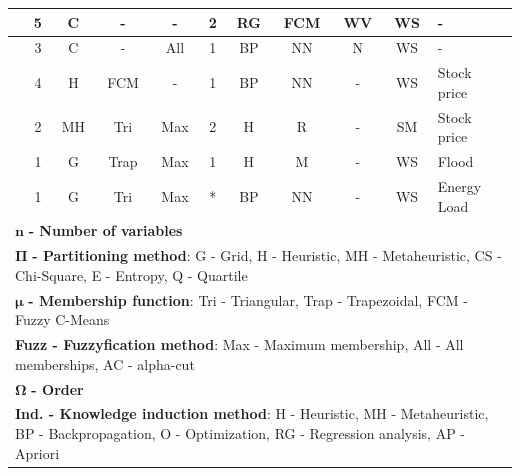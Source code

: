 \begin{center}
\begin{landscape}
\begin{longtable}[c]{|m{4cm}|c|c|c|c|c|c|c|c|c|m{5cm}|}
\cite{Yang2018}            & 5                  & C            & -           & -                      & 2              & RG                      & FCM                 & WV                 & WS            & -                     \\ \hline
\cite{Tran2018}            & 3                  & C            & -           & All                    & 1              & BP                            & NN                & N            & WS            & -                     \\ \hline
\cite{Zhang2018}           & 4                  & H                & FCM         & -                      & 1              & BP                             & NN                 & -                        & WS            & Stock price           \\ \hline
\cite{Zhang2018a}          & 2                  & MH         & Tri  & Max                & 2              & H                       & R               & -                        & SM              & Stock price           \\ \hline
\cite{Chen2019a}            & 1                  & G                  & Trap & Max                & 1              & H                       & M              & -                        & WS            & Flood \\  \hline
\cite{Sadaei2019}            & 1                  & G                  & Tri & Max                &  *              & BP                       & NN              & -                        & WS            & Energy Load \\  \hline
\multicolumn{11}{l}{$\mathbf{n}$\textbf{ - Number of variables}} \\
\multicolumn{11}{p{20cm}}{$\mathbf{\Pi}$\textbf{ - Partitioning method}: G - Grid, H - Heuristic, MH - Metaheuristic, CS - Chi-Square, E - Entropy, Q - Quartile} \\
\multicolumn{11}{p{20cm}}{$\mathbf{\mu}$\textbf{ - Membership function}: Tri - Triangular, Trap - Trapezoidal, FCM - Fuzzy C-Means} \\
\multicolumn{11}{p{20cm}}{\textbf{Fuzz - Fuzzyfication method}: Max - Maximum membership, All - All memberships, AC - alpha-cut} \\
\multicolumn{11}{l}{$\mathbf{\Omega}$\textbf{  - Order}} \\
\multicolumn{11}{p{20cm}}{\textbf{Ind. - Knowledge induction method}: H - Heuristic, MH - Metaheuristic, BP - Backpropagation, O - Optimization, RG - Regression analysis, AP - Apriori} \\

\end{longtable}
\end{landscape}
\end{center}
